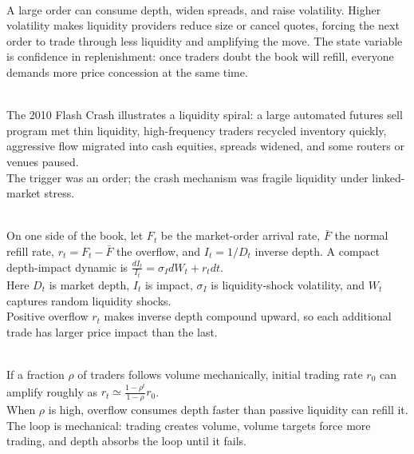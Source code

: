 \documentclass[a4paper,oneside,openany]{book}
\begin{document}
\begin{mechanism} \\
A large order can consume depth, widen spreads, and raise volatility. Higher volatility makes liquidity providers reduce size or cancel quotes, forcing the next order to trade through less liquidity and amplifying the move. The state variable is confidence in replenishment: once traders doubt the book will refill, everyone demands more price concession at the same time.
\end{mechanism}
\begin{casestudy} \\
The 2010 Flash Crash illustrates a liquidity spiral: a large automated futures sell program met thin liquidity, high-frequency traders recycled inventory quickly, aggressive flow migrated into cash equities, spreads widened, and some routers or venues paused.\\
The trigger was an order; the crash mechanism was fragile liquidity under linked-market stress.
\end{casestudy}
\begin{model} \\
On one side of the book, let $F_t$ be the market-order arrival rate, $\bar{F}$ the normal refill rate, $r_t=F_t-\bar{F}$ the overflow, and $I_t=1/D_t$ inverse depth. A compact depth-impact dynamic is $\frac{dI_t}{I_t}=\sigma_I dW_t+r_tdt$.\\
Here $D_t$ is market depth, $I_t$ is impact, $\sigma_I$ is liquidity-shock volatility, and $W_t$ captures random liquidity shocks.\\
Positive overflow $r_t$ makes inverse depth compound upward, so each additional trade has larger price impact than the last.
\end{model}
\begin{mechanism} \\
If a fraction $\rho$ of traders follows volume mechanically, initial trading rate $r_0$ can amplify roughly as $r_t\simeq \frac{1-\rho^t}{1-\rho}r_0$.\\
When $\rho$ is high, overflow consumes depth faster than passive liquidity can refill it. The loop is mechanical: trading creates volume, volume targets force more trading, and depth absorbs the loop until it fails.
\end{mechanism}
\end{document}

